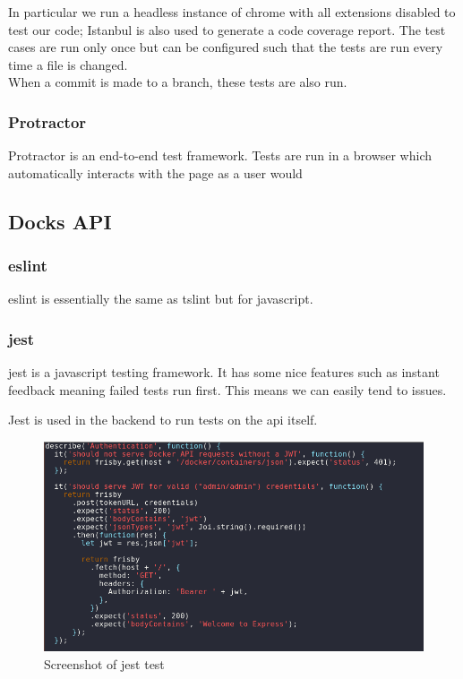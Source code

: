 \documentclass[]{article}
\begin{document}
In particular we run a headless instance of chrome with all extensions
disabled to test our code; Istanbul is also used to generate a code coverage
report. The test cases are run only once but can be configured such that the tests
are run every time a file is changed.
\\
When a commit is made to a branch, these tests are also run.

\subsubsection{Protractor}
Protractor is an end-to-end test framework. Tests are run in a browser which automatically interacts
with the page as a user would

\subsection{Docks API}

\subsubsection{eslint}
eslint is essentially the same as tslint but for javascript.

\subsubsection{jest}
jest is a javascript testing framework.
It has some nice features such as instant feedback meaning
failed tests run first. This means we can easily tend to issues.

Jest is used in the backend to run tests on the api itself.
\begin{figure}[H]
	\centering
	\includegraphics[scale=0.5]{jest.png}
	\caption{Screenshot of jest test}
\end{figure}
\end{document}
